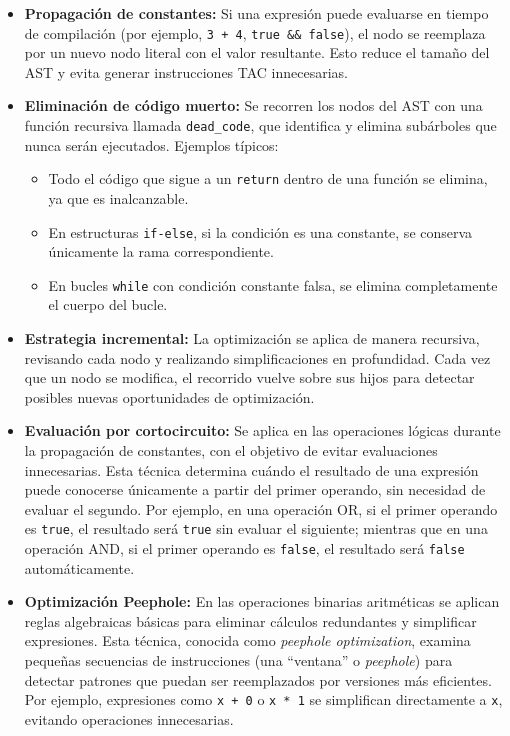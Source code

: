 \documentclass[12pt,a4paper]{article}
\begin{document}
\begin{itemize}
    \item \textbf{Propagación de constantes:}  
    Si una expresión puede evaluarse en tiempo de compilación (por ejemplo, \texttt{3 + 4}, \texttt{true \&\& false}), el nodo se reemplaza por un nuevo nodo literal con el valor resultante. Esto reduce el tamaño del AST y evita generar instrucciones TAC innecesarias.
    
    \item \textbf{Eliminación de código muerto:}  
    Se recorren los nodos del AST con una función recursiva llamada \texttt{dead\_code}, que identifica y elimina subárboles que nunca serán ejecutados.  
    Ejemplos típicos:
    \begin{itemize}
        \item Todo el código que sigue a un \texttt{return} dentro de una función se elimina, ya que es inalcanzable.
        \item En estructuras \texttt{if-else}, si la condición es una constante, se conserva únicamente la rama correspondiente.
        \item En bucles \texttt{while} con condición constante falsa, se elimina completamente el cuerpo del bucle.
    \end{itemize}
    
    \item \textbf{Estrategia incremental:}  
    La optimización se aplica de manera recursiva, revisando cada nodo y realizando simplificaciones en profundidad. Cada vez que un nodo se modifica, el recorrido vuelve sobre sus hijos para detectar posibles nuevas oportunidades de optimización.

    \item \textbf{Evaluación por cortocircuito:}
    Se aplica en las operaciones lógicas durante la propagación de constantes, con el objetivo de evitar evaluaciones innecesarias. Esta técnica determina cuándo el resultado de una expresión puede conocerse únicamente a partir del primer operando, sin necesidad de evaluar el segundo. Por ejemplo, en una operación OR, si el primer operando es \texttt{true}, el resultado será \texttt{true} sin evaluar el siguiente; mientras que en una operación AND, si el primer operando es \texttt{false}, el resultado será \texttt{false} automáticamente.
    
    \item \textbf{Optimización Peephole:}
    En las operaciones binarias aritméticas se aplican reglas algebraicas básicas para eliminar cálculos redundantes y simplificar expresiones. Esta técnica, conocida como \emph{peephole optimization}, examina pequeñas secuencias de instrucciones (una “ventana” o \emph{peephole}) para detectar patrones que puedan ser reemplazados por versiones más eficientes. Por ejemplo, expresiones como \texttt{x + 0} o \texttt{x * 1} se simplifican directamente a \texttt{x}, evitando operaciones innecesarias.
\end{itemize}
\end{document}
